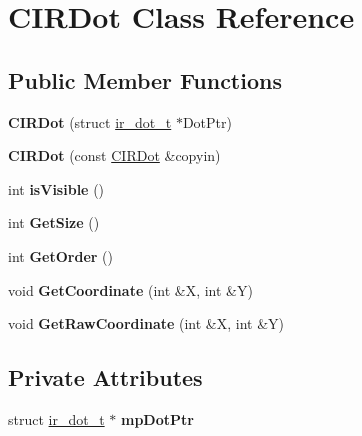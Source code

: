 \hypertarget{class_c_i_r_dot}{\section{\-C\-I\-R\-Dot \-Class \-Reference}
\label{class_c_i_r_dot}
}
\subsection*{\-Public \-Member \-Functions}
\begin{DoxyCompactItemize}
\item 
\hypertarget{class_c_i_r_dot_ae2b021d5fea77cea85cac86f4741a995}{{\bfseries \-C\-I\-R\-Dot} (struct \hyperlink{structir__dot__t}{ir\-\_\-dot\-\_\-t} $\ast$\-Dot\-Ptr)}\label{class_c_i_r_dot_ae2b021d5fea77cea85cac86f4741a995}

\item 
\hypertarget{class_c_i_r_dot_abed3b30052805bc25e54dacec11f35a8}{{\bfseries \-C\-I\-R\-Dot} (const \hyperlink{class_c_i_r_dot}{\-C\-I\-R\-Dot} \&copyin)}\label{class_c_i_r_dot_abed3b30052805bc25e54dacec11f35a8}

\item 
\hypertarget{class_c_i_r_dot_a52d88e14f8b1926faefb3c7ae3392a81}{int {\bfseries is\-Visible} ()}\label{class_c_i_r_dot_a52d88e14f8b1926faefb3c7ae3392a81}

\item 
\hypertarget{class_c_i_r_dot_a55d84ee46d123c4cee2d5972f3416674}{int {\bfseries \-Get\-Size} ()}\label{class_c_i_r_dot_a55d84ee46d123c4cee2d5972f3416674}

\item 
\hypertarget{class_c_i_r_dot_a820ce87be176b3d2cf15f27b7fe60ee3}{int {\bfseries \-Get\-Order} ()}\label{class_c_i_r_dot_a820ce87be176b3d2cf15f27b7fe60ee3}

\item 
\hypertarget{class_c_i_r_dot_a1eee8cc3c7dcdb20c0e73792386bb215}{void {\bfseries \-Get\-Coordinate} (int \&\-X, int \&\-Y)}\label{class_c_i_r_dot_a1eee8cc3c7dcdb20c0e73792386bb215}

\item 
\hypertarget{class_c_i_r_dot_aba4908bf9d66671639b8b767df162796}{void {\bfseries \-Get\-Raw\-Coordinate} (int \&\-X, int \&\-Y)}\label{class_c_i_r_dot_aba4908bf9d66671639b8b767df162796}

\end{DoxyCompactItemize}
\subsection*{\-Private \-Attributes}
\begin{DoxyCompactItemize}
\item 
\hypertarget{class_c_i_r_dot_a82b8b5361047f551074d7f9cf8d5d2ac}{struct \hyperlink{structir__dot__t}{ir\-\_\-dot\-\_\-t} $\ast$ {\bfseries mp\-Dot\-Ptr}}\label{class_c_i_r_dot_a82b8b5361047f551074d7f9cf8d5d2ac}

\end{DoxyCompactItemize}


